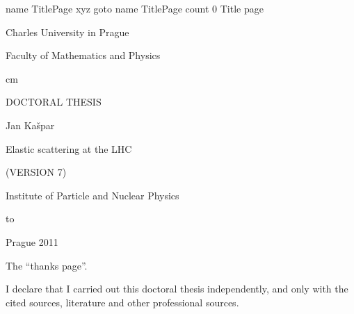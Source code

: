 







\let\BiggerFonts\SetFontSizesXII
\let\NormalFonts\SetFontSizesX
\let\SmallerFonts\SetFontSizesVIII

\NormalFonts

\ParIndent=5mm

\Reftrue
\Toctrue

\iffalse
	\ShowLabelstrue \advance\hoffset-1cm
\else
	\def\FootText{(VERSION 7)}
\fi

\def\pmt#1{{\tt #1}}

\def\caption#1{%
	\vskip\baselineskip
	{\bf #1}%
	\vskip\baselineskip
}


\pdfdest name {TitlePage} xyz
\pdfoutline goto name {TitlePage} count 0 {Title page}%


\centerline{\fPbxiv Charles University in Prague}
\centerline{\fPbxiv Faculty of Mathematics and Physics}
	cm
\centerline{\fPbxx DOCTORAL THESIS}
\vskip1cm
\centerline{}
\vskip3cm
\centerline{\fPbxiv Jan Ka\v spar}
\vskip1cm
\centerline{\fPbxx Elastic scattering at the LHC}
\centerline{\fPbxx\FootText}
\vskip2cm
\centerline{\fPbxiv Institute of Particle and Nuclear Physics}
\ialign to
\vskip2cm
\centerline{\fPbxiv Prague 2011}


\vfil\eject


The ``thanks page''.

\vfil\eject


\hbox{}\vfil

I declare that I carried out this doctoral thesis independently, and only with the cited sources, literature and other professional sources.

